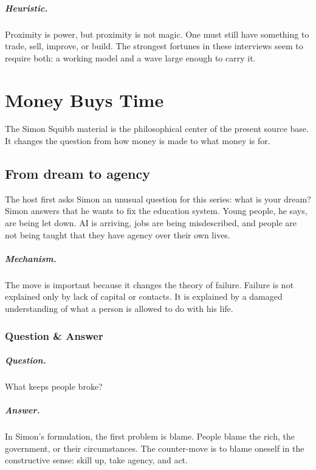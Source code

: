\documentclass[11pt,oneside]{book}
\begin{document}
\paragraph{Heuristic.} Proximity is power, but proximity is not magic. One must still have something to trade, sell, improve, or build. The strongest fortunes in these interviews seem to require both: a working model and a wave large enough to carry it.

\chapter{Money Buys Time}

The Simon Squibb material is the philosophical center of the present source base. It changes the question from how money is made to what money is for.

\section{From dream to agency}

The host first asks Simon an unusual question for this series: what is your dream? Simon answers that he wants to fix the education system. Young people, he says, are being let down. AI is arriving, jobs are being misdescribed, and people are not being taught that they have agency over their own lives.

\paragraph{Mechanism.} The move is important because it changes the theory of failure. Failure is not explained only by lack of capital or contacts. It is explained by a damaged understanding of what a person is allowed to do with his life.

\subsection{Question \& Answer}

\paragraph{Question.} What keeps people broke?

\paragraph{Answer.} In Simon's formulation, the first problem is blame. People blame the rich, the government, or their circumstances. The counter-move is to blame oneself in the constructive sense: skill up, take agency, and act.
\end{document}
